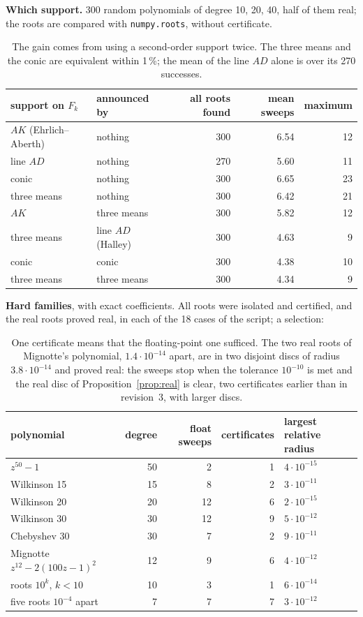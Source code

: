 \documentclass[10pt,a4paper]{article}
\theoremstyle{definition}
\numberwithin{equation}{section}
\begin{document}
\textbf{Which support.} 300 random polynomials of degree 10, 20, 40, half of them real; the roots are
compared with \texttt{numpy.roots}, without certificate.
\begin{table}[H]\centering\small
\begin{tabular}{llrrr}
\toprule
support on $F_k$ & announced by & all roots found & mean sweeps & maximum\\
\midrule
$AK$ (Ehrlich--Aberth) & nothing & 300 & 6.54 & 12\\
line $AD$ & nothing & 270 & 5.60 & 11\\
conic & nothing & 300 & 6.65 & 23\\
three means & nothing & 300 & 6.42 & 21\\
$AK$ & three means & 300 & 5.82 & 12\\
three means & line $AD$ (Halley) & 300 & 4.63 & 9\\
conic & conic & 300 & 4.38 & 10\\
three means & three means & 300 & 4.34 & 9\\
\bottomrule
\end{tabular}
\caption{The gain comes from using a second-order support twice. The three means and the conic are
equivalent within 1\,\%; the mean of the line $AD$ alone is over its 270 successes.}
\end{table}

\textbf{Hard families}, with exact coefficients. All roots were isolated and certified, and the real
roots proved real, in each of the 18 cases of the script; a selection:
\begin{table}[H]\centering\small
\begin{tabular}{lrrrl}
\toprule
polynomial & degree & float sweeps & certificates & largest relative radius\\
\midrule
$z^{50}-1$ & 50 & 2 & 1 & $4\cdot10^{-15}$\\
Wilkinson 15 & 15 & 8 & 2 & $3\cdot10^{-11}$\\
Wilkinson 20 & 20 & 12 & 6 & $2\cdot10^{-15}$\\
Wilkinson 30 & 30 & 12 & 9 & $5\cdot10^{-12}$\\
Chebyshev 30 & 30 & 7 & 2 & $9\cdot10^{-11}$\\
Mignotte $z^{12}-2(100z-1)^2$ & 12 & 9 & 6 & $4\cdot10^{-12}$\\
roots $10^k$, $k<10$ & 10 & 3 & 1 & $6\cdot10^{-14}$\\
five roots $10^{-4}$ apart & 7 & 7 & 7 & $3\cdot10^{-12}$\\
\bottomrule
\end{tabular}
\caption{One certificate means that the floating-point one sufficed. The two real roots of Mignotte's
polynomial, $1.4\cdot10^{-14}$ apart, are in two disjoint discs of radius $3.8\cdot10^{-14}$ and
proved real: the sweeps stop when the tolerance $10^{-10}$ is met and the real disc of
Proposition~\ref{prop:real} is clear, two certificates earlier than in revision~3, with larger discs.}
\end{table}
\end{document}
